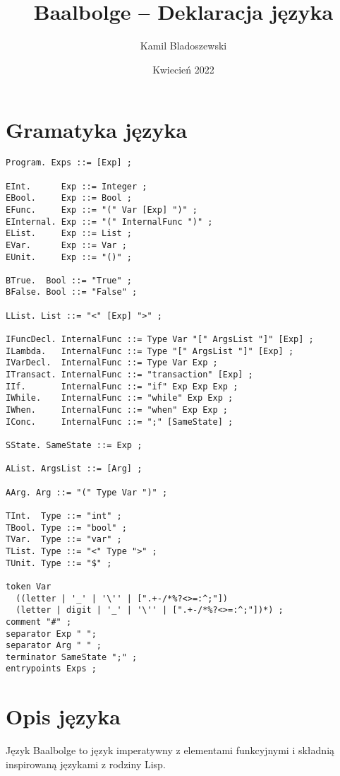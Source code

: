\documentclass{article}
\title{Baalbolge -- Deklaracja języka}
\author{Kamil Bladoszewski}
\date{Kwiecień 2022}
\begin{document}
\maketitle

\tableofcontents

\pagebreak

\section{Gramatyka języka}

\begin{lstlisting}
Program. Exps ::= [Exp] ;

EInt.      Exp ::= Integer ;
EBool.     Exp ::= Bool ;
EFunc.     Exp ::= "(" Var [Exp] ")" ;
EInternal. Exp ::= "(" InternalFunc ")" ;
EList.     Exp ::= List ;
EVar.      Exp ::= Var ;
EUnit.     Exp ::= "()" ;

BTrue.  Bool ::= "True" ;
BFalse. Bool ::= "False" ;

LList. List ::= "<" [Exp] ">" ;

IFuncDecl. InternalFunc ::= Type Var "[" ArgsList "]" [Exp] ;
ILambda.   InternalFunc ::= Type "[" ArgsList "]" [Exp] ;
IVarDecl.  InternalFunc ::= Type Var Exp ;
ITransact. InternalFunc ::= "transaction" [Exp] ;
IIf.       InternalFunc ::= "if" Exp Exp Exp ;
IWhile.    InternalFunc ::= "while" Exp Exp ;
IWhen.     InternalFunc ::= "when" Exp Exp ;
IConc.     InternalFunc ::= ";" [SameState] ;

SState. SameState ::= Exp ;

AList. ArgsList ::= [Arg] ;

AArg. Arg ::= "(" Type Var ")" ;

TInt.  Type ::= "int" ;
TBool. Type ::= "bool" ;
TVar.  Type ::= "var" ;
TList. Type ::= "<" Type ">" ;
TUnit. Type ::= "$" ;

token Var
  ((letter | '_' | '\'' | [".+-/*%?<>=:^;"])
  (letter | digit | '_' | '\'' | [".+-/*%?<>=:^;"])*) ;
comment "#" ;
separator Exp " ";
separator Arg " " ;
terminator SameState ";" ;
entrypoints Exps ;

\end{lstlisting}

\pagebreak

\section{Opis języka}

Język Baalbolge to język imperatywny z elementami funkcyjnymi i składnią inspirowaną językami z rodziny Lisp.
\end{document}
